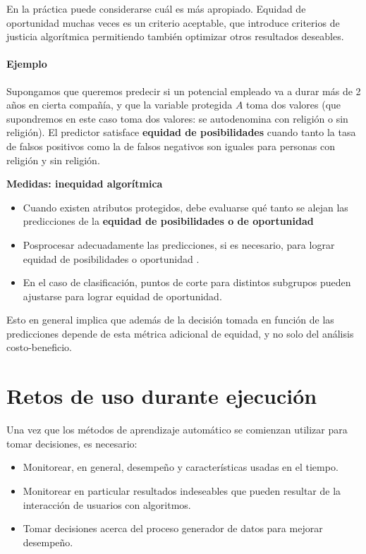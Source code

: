 \documentclass[
]{book}
\providecommand{\tightlist}{%
  \setlength{\itemsep}{0pt}\setlength{\parskip}{0pt}}
\let\BeginKnitrBlock\begin \let\EndKnitrBlock\end
\begin{document}
En la práctica puede considerarse cuál es más apropiado. Equidad de oportunidad muchas veces es un criterio aceptable, que
introduce criterios de justicia algorítmica permitiendo también optimizar otros resultados deseables.

\hypertarget{ejemplo-4}{%
\subsubsection*{Ejemplo}\label{ejemplo-4}}


Supongamos que queremos predecir si un potencial empleado va a durar más de 2 años en cierta compañía, y que la variable
protegida \(A\) toma dos valores (que supondremos en este caso toma dos valores: se autodenomina con religión o sin religión).
El predictor satisface \textbf{equidad de posibilidades} cuando tanto la tasa de falsos positivos como la de falsos negativos
son iguales para personas con religión y sin religión.

\BeginKnitrBlock{rmdtip}
\textbf{Medidas: inequidad algorítmica}

\begin{itemize}
\item
  Cuando existen atributos protegidos, debe evaluarse qué tanto se alejan las predicciones de la \textbf{equidad de posibilidades
  o de oportunidad}
\item
  Posprocesar adecuadamente las predicciones, si es necesario, para lograr equidad de posibilidades o oportunidad \citep{hardt}.
\item
  En el caso de clasificación, puntos de corte para distintos subgrupos pueden ajustarse para lograr equidad de oportunidad.
\end{itemize}
\EndKnitrBlock{rmdtip}

Esto en general implica que además de la decisión tomada en función de las predicciones depende de esta métrica adicional
de equidad, y no solo del análisis costo-beneficio.

\hypertarget{retos-de-uso-durante-ejecuciuxf3n}{%
\chapter{Retos de uso durante ejecución}\label{retos-de-uso-durante-ejecuciuxf3n}}

Una vez que los métodos de aprendizaje automático se comienzan utilizar para tomar decisiones, es necesario:

\begin{itemize}
\tightlist
\item
  Monitorear, en general, desempeño y características usadas en el tiempo.
\item
  Monitorear en particular resultados indeseables que pueden resultar de la interacción de usuarios con algoritmos.
\item
  Tomar decisiones acerca del proceso generador de datos para mejorar desempeño.
\end{itemize}
\end{document}
